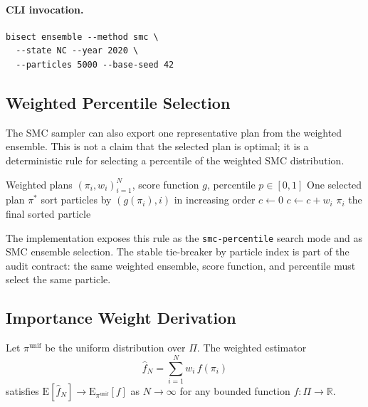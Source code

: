 \paragraph{CLI invocation.}
\begin{verbatim}
bisect ensemble --method smc \
  --state NC --year 2020 \
  --particles 5000 --base-seed 42
\end{verbatim}

\subsection{Weighted Percentile Selection}
\label{subsec:smc-percentile}

The SMC sampler can also export one representative plan from the weighted
ensemble. This is not a claim that the selected plan is optimal; it is a
deterministic rule for selecting a percentile of the weighted SMC distribution.

\begin{algorithm}
\caption{\smc{} Percentile Selection}
\label{alg:smc-percentile}
\begin{algorithmic}[1]
\Require Weighted plans $(\pi_i,w_i)_{i=1}^N$, score function $g$, percentile $p \in [0,1]$
\Ensure One selected plan $\pi^*$
\State sort particles by $(g(\pi_i), i)$ in increasing order
\State $c \gets 0$
\For{$i$ in sorted order}
  \State $c \gets c + w_i$
    \State \Return $\pi_i$
  \EndIf
\EndFor
\State \Return the final sorted particle
\end{algorithmic}
\end{algorithm}

The implementation exposes this rule as the \texttt{smc-percentile} search
mode and as SMC ensemble selection. The stable tie-breaker by particle index is
part of the audit contract: the same weighted ensemble, score function, and
percentile must select the same particle.

\subsection{Importance Weight Derivation}
\label{subsec:weight-derivation}

\begin{proposition}
\label{prop:weight-correct}
Let $\pi^{\mathrm{unif}}$ be the uniform distribution over $\Pi$.
The \smc{} weighted estimator
\[
  \hat{f}_N = \sum_{i=1}^N w_i \, f(\pi_i)
\]
satisfies $\mathrm{E}[\hat{f}_N] \to \mathrm{E}_{\pi^{\mathrm{unif}}}[f]$ as
$N \to \infty$ for any bounded function $f : \Pi \to \mathbb{R}$.
\end{proposition}

